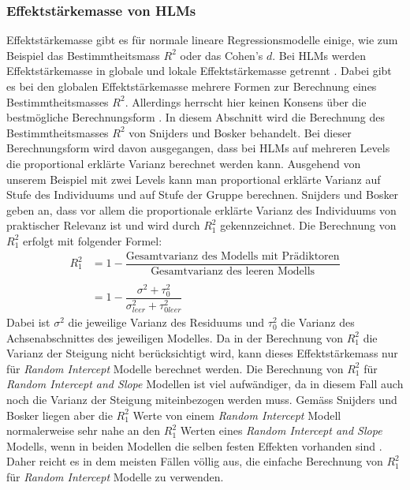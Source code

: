 \documentclass[12pt]{article}\usepackage[]{graphicx}\usepackage[]{color}
\begin{document}
\subsubsection{Effektstärkemasse von HLMs}
Effektstärkemasse gibt es für normale lineare Regressionsmodelle einige, wie zum Beispiel das Bestimmtheitsmass $R^2$ oder das Cohen's $d$. Bei HLMs werden Effektstärkemasse in globale und lokale Effektstärkemasse getrennt \citep{PEUGH201085}. Dabei gibt es bei den globalen Effektstärkemasse mehrere Formen zur Berechnung eines Bestimmtheitsmasses $R^2$. Allerdings herrscht hier keinen Konsens über die bestmögliche Berechnungsform \citep{raudenbush2002hierarchical,SnijdersTomA.B2012Ma:a}. In diesem Abschnitt wird die Berechnung des Bestimmtheitsmasses $R^2$ von Snijders und Bosker \citeyearpar{SnijdersTomA.B2012Ma:a} behandelt. Bei dieser Berechnungsform wird davon ausgegangen, dass bei HLMs auf mehreren Levels die proportional erklärte Varianz berechnet werden kann. Ausgehend von unserem Beispiel mit zwei Levels kann man proportional erklärte Varianz auf Stufe des Individuums und auf Stufe der Gruppe berechnen. Snijders und Bosker \citeyearpar{SnijdersTomA.B2012Ma:a} geben an, dass vor allem die proportionale erklärte Varianz des Individuums von praktischer Relevanz ist und wird durch $R_{1}^2$ gekennzeichnet. Die Berechnung von $R_{1}^2$ erfolgt mit folgender Formel:
\begin{equation} \label{eq:r_square}
\begin{split}	
 R_{1}^2 & = 1 - \dfrac{\text{Gesamtvarianz des Modells mit Prädiktoren}}{\text{Gesamtvarianz des leeren Modells}} \\
 & \\
 & = 1 - \dfrac{\sigma^2 + \tau_{0}^2}{\sigma_{leer}^2 + \tau_{0leer}^2}
\end{split}	
\end{equation}
Dabei ist $\sigma^2$ die jeweilige Varianz des Residuums und $\tau_{0}^2$ die Varianz des Achsenabschnittes des jeweiligen Modelles. Da in der Berechnung von $R_{1}^2$ die Varianz der Steigung nicht berücksichtigt wird, kann dieses Effektstärkemass nur für \textit{Random Intercept} Modelle berechnet werden. Die Berechnung von $R_{1}^2$ für \textit{Random Intercept and Slope} Modellen ist viel aufwändiger, da in diesem Fall auch noch die Varianz der Steigung miteinbezogen werden muss. Gemäss Snijders und Bosker liegen aber die $R_{1}^2$ Werte von einem \textit{Random Intercept} Modell normalerweise sehr nahe an den $R_{1}^2$ Werten eines \textit{Random Intercept and Slope} Modells, wenn in beiden Modellen die selben festen Effekten vorhanden sind \citep{SnijdersTomA.B2012Ma:a}. Daher reicht es in dem meisten Fällen völlig aus, die einfache Berechnung von $R_{1}^2$ für \textit{Random Intercept} Modelle zu verwenden.
\end{document}
